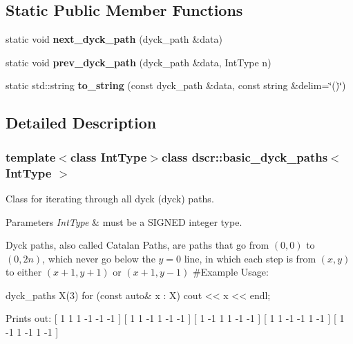 \subsection*{Static Public Member Functions}
\begin{DoxyCompactItemize}
\item 
\hypertarget{classdscr_1_1basic__dyck__paths_acd173bddbec02810c7b264ed89519eb4}{static void {\bfseries next\-\_\-dyck\-\_\-path} (dyck\-\_\-path \&data)}\label{classdscr_1_1basic__dyck__paths_acd173bddbec02810c7b264ed89519eb4}

\item 
\hypertarget{classdscr_1_1basic__dyck__paths_a360e7440077829b7a9f63733dbb41dfe}{static void {\bfseries prev\-\_\-dyck\-\_\-path} (dyck\-\_\-path \&data, Int\-Type n)}\label{classdscr_1_1basic__dyck__paths_a360e7440077829b7a9f63733dbb41dfe}

\item 
\hypertarget{classdscr_1_1basic__dyck__paths_a68c71b07e1e1375f9175f77213bf1c8f}{static std\-::string {\bfseries to\-\_\-string} (const dyck\-\_\-path \&data, const string \&delim=\char`\"{}()\char`\"{})}\label{classdscr_1_1basic__dyck__paths_a68c71b07e1e1375f9175f77213bf1c8f}

\end{DoxyCompactItemize}


\subsection{Detailed Description}
\subsubsection*{template$<$class Int\-Type$>$class dscr\-::basic\-\_\-dyck\-\_\-paths$<$ Int\-Type $>$}

Class for iterating through all dyck (dyck) paths. 


\begin{DoxyParams}{Parameters}
{\em Int\-Type} & must be a S\-I\-G\-N\-E\-D integer type.\\
\hline
\end{DoxyParams}
Dyck paths, also called Catalan Paths, are paths that go from $(0,0)$ to $(0,2n)$, which never go below the $ y=0$ line, in which each step is from $(x,y)$ to either $(x+1,y+1)$ or $(x+1,y-1)$ \#\-Example Usage\-: \begin{DoxyVerb}dyck_paths X(3)
for (const auto& x : X)
    cout << x << endl;
\end{DoxyVerb}
 Prints out\-: \mbox{[} 1 1 1 -\/1 -\/1 -\/1 \mbox{]} \mbox{[} 1 1 -\/1 1 -\/1 -\/1 \mbox{]} \mbox{[} 1 -\/1 1 1 -\/1 -\/1 \mbox{]} \mbox{[} 1 1 -\/1 -\/1 1 -\/1 \mbox{]} \mbox{[} 1 -\/1 1 -\/1 1 -\/1 \mbox{]}

